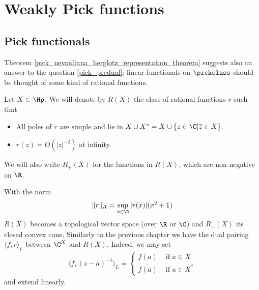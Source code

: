 \section{Weakly Pick functions}
\subsection{Pick functionals}

Theorem \ref{pick_nevanlinna_herglotz_representation_theorem} suggests also an answer to the question \ref{pick_predual}: linear functionals on $\pickclass$ should be thought of some kind of rational functions.
\begin{maar}
	Let $X \subset \Hp$. We will denote by $R(X)$ the class of rational functions $r$ such that
	\begin{itemize}
		\item All poles of $r$ are simple and lie in $X \cup X^{*} = X \cup \{z \in \C | \overline{z} \in X\}$.
		\item $r(z) = O(|z|^{-2})$ at infinity.
	\end{itemize}
	We will also write $R_{+}(X)$ for the functions in $R(X)$, which are non-negative on $\R$.
\end{maar}
With the norm
\begin{align*}
	\|r\|_{R} = \sup_{x \in \R} |r(x)| (x^2 + 1)
\end{align*}
$R(X)$ becomes a topological vector space (over $\R$ or $\C$) and $R_{+}(X)$ its closed convex cone. Similarly to the previous chapter we have the dual pairing $\langle f, r \rangle_{L}$ between $\C^{X}$ and $R(X)$. Indeed, we may set
\begin{align*}
	\langle f, (z - a)^{-1} \rangle_{L} =
	\begin{cases}
		f(a) & \text{ if $a \in X$} \\
		\overline{f(\overline{a})} & \text{ if $a \in X^{*}$}
	\end{cases}
\end{align*}
and extend linearly.

